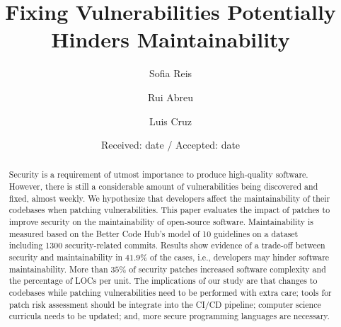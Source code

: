 \documentclass[smallextended]{svjour3}       %
\begin{document}
\title{Fixing Vulnerabilities Potentially Hinders Maintainability}

\author{Sofia Reis         \and
        Rui Abreu           \and
        Luis Cruz
}


\date{Received: date / Accepted: date}


\maketitle

\begin{abstract}
Security is a requirement of utmost importance to produce 
high-quality software. However, there is still a considerable amount 
of vulnerabilities being discovered and fixed, almost weekly. We 
hypothesize that developers affect the maintainability of their 
codebases when patching vulnerabilities. This paper evaluates the 
impact of patches to improve security on the maintainability of 
open-source software. Maintainability is measured based on the 
Better Code Hub’s model of 10 guidelines on a dataset including 
1300 security-related commits. Results show evidence of a trade-off 
between security and maintainability in $41.9\%$ of the cases, i.e., developers 
may hinder software maintainability. More than $35\%$ of security 
patches increased software complexity and the percentage 
of LOCs per unit. The implications of our study 
are that changes to codebases while patching vulnerabilities need to 
be performed with extra care; tools for patch risk assessment should 
be integrate into the CI/CD pipeline; computer science curricula 
needs to be updated; and, more secure programming languages are 
necessary.
\end{abstract}
\end{document}
